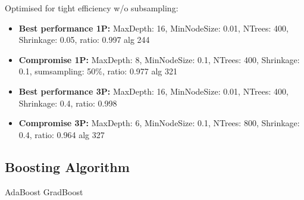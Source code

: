Optimised for tight efficiency w/o subsampling:
\begin{itemize}
\item \textbf{Best performance 1P:} MaxDepth: 16, MinNodeSize: 0.01, NTrees:
  400, Shrinkage: 0.05, ratio: 0.997 \textrightarrow alg 244
\item \textbf{Compromise 1P:} MaxDepth: 8, MinNodeSize: 0.1, NTrees: 400,
  Shrinkage: 0.1, sumsampling: 50\%, ratio: 0.977 \textrightarrow alg 321
\item \textbf{Best performance 3P:} MaxDepth: 16, MinNodeSize: 0.01, NTrees:
  400, Shrinkage: 0.4, ratio: 0.998 
\item \textbf{Compromise 3P:} MaxDepth: 6, MinNodeSize: 0.1, NTrees: 800,
  Shrinkage: 0.4, ratio: 0.964 \textrightarrow alg 327
\end{itemize}

\subsection{Boosting Algorithm}
\label{sec:bdt_boosting}
AdaBoost \textrightarrow GradBoost

